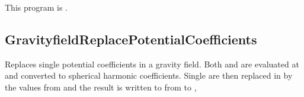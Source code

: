This program is .
\clearpage
\subsection{GravityfieldReplacePotentialCoefficients}\label{GravityfieldReplacePotentialCoefficients}
Replaces single potential coefficients in a gravity field.
Both 
and  are evaluated
at  and converted to spherical harmonic coefficients.
Single  are then replaced in 
by the values from 
and the result is written to 
from  to ,


